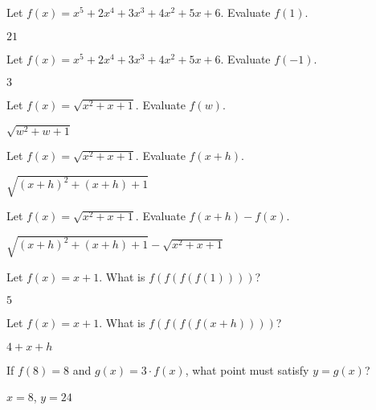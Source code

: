 \begin{exercises}
\begin{exercise} Let $f(x) = x^5+2x^4+3x^3+4x^2+5x+6$. Evaluate $f(1)$.
\begin{answer}
$21$
\end{answer}
\end{exercise}

\begin{exercise} Let $f(x) = x^5+2x^4+3x^3+4x^2+5x+6$. Evaluate $f(-1)$.
\begin{answer}
$3$
\end{answer}
\end{exercise}

\begin{exercise} Let $f(x) =\sqrt{x^2+x+1}$. Evaluate $f(w)$.
\begin{answer}
$\sqrt{w^2+w+1}$
\end{answer}
\end{exercise}

\begin{exercise} Let $f(x) =\sqrt{x^2+x+1}$. Evaluate $f(x+h)$.
\begin{answer}
$\sqrt{(x+h)^2+(x+h)+1}$
\end{answer}
\end{exercise}

\begin{exercise} Let $f(x) = \sqrt{x^2+x+1}$. Evaluate $f(x+h) - f(x)$.
\begin{answer}
$\sqrt{(x+h)^2+(x+h)+1} - \sqrt{x^2+x+1}$
\end{answer}
\end{exercise}

\begin{exercise} Let $f(x) = x+1$. What is $f(f(f(f(1))))$?
\begin{answer}
$5$
\end{answer}
\end{exercise}

\begin{exercise} Let $f(x) = x+1$. What is $f(f(f(f(x+h))))$?
\begin{answer}
$4+x+h$
\end{answer}
\end{exercise}

\begin{exercise} 
If $f(8) = 8$ and $g(x)=3\cdot f(x)$, what point must satisfy $y=g(x)$?
\begin{answer}
$x=8$, $y=24$
\end{answer}
\end{exercise}


\end{exercises}
